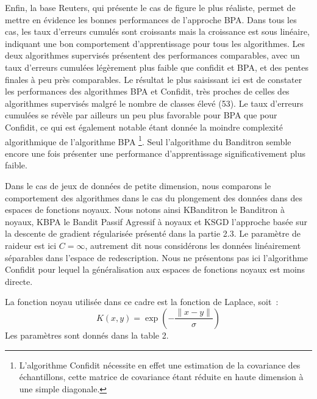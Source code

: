 \documentclass[twocolumn]{article}
\begin{document}
Enfin, la base Reuters, qui présente le cas de figure le plus réaliste, permet de mettre en évidence les bonnes performances de l'approche BPA. Dans tous les cas, les taux d'erreurs cumulés sont croissants mais la croissance est sous linéaire, indiquant une bon comportement d'apprentissage pour tous les algorithmes. Les deux algorithmes supervisés présentent des performances comparables, avec un taux d'erreurs cumulées légèrement plus faible  que confidit et BPA, et des pentes finales à peu près comparables. Le résultat le plus saisissant ici est de constater les performances des algorithmes BPA et Confidit, très proches de celles des algorithmes supervisés malgré le nombre de classes élevé (53). Le taux d'erreurs cumulées se révèle par ailleurs un peu plus favorable pour BPA que pour Confidit, ce qui est également notable étant donnée la moindre complexité algorithmique de l'algorithme BPA \footnote{L'algorithme Confidit nécessite en effet une estimation de la covariance des échantillons, cette matrice de covariance étant réduite en haute dimension à une simple diagonale.}. Seul l'algorithme du Banditron semble encore une fois présenter une performance d'apprentissage significativement plus faible. 


Dans le cas de jeux de données de petite dimension, nous comparons le comportement des algorithmes dans le cas du plongement des données dans des espaces de fonctions noyaux. Nous notons ainsi KBanditron le Banditron à noyaux, KBPA le Bandit Passif Agressif à noyaux et KSGD l'approche basée sur la descente de gradient régularisée présenté dans la partie 2.3. Le paramètre de raideur est ici $C = \infty$, autrement dit nous considérons les données linéairement séparables dans l'espace de redescription. Nous ne présentons pas ici l'algorithme Confidit pour lequel la généralisation aux espaces de fonctions noyaux est moins directe. 

La fonction noyau utilisée dans ce cadre est la fonction de Laplace, soit~:
\[K(x,y) = \exp{\left(-\frac{\parallel{x-y}\parallel}{\sigma}\right)}\]
Les paramètres sont donnés dans la table 2. 
\end{document}

